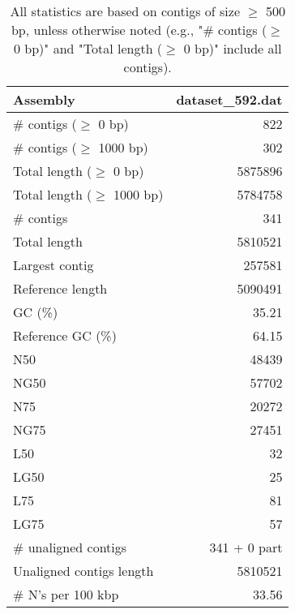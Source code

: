 \documentclass[12pt,a4paper]{article}
\begin{document}
\begin{table}[ht]
\begin{center}
\caption{All statistics are based on contigs of size $\geq$ 500 bp, unless otherwise noted (e.g., "\# contigs ($\geq$ 0 bp)" and "Total length ($\geq$ 0 bp)" include all contigs).}
\begin{tabular}{|l*{1}{|r}|}
\hline
Assembly & dataset\_592.dat \\ \hline
\# contigs ($\geq$ 0 bp) & 822 \\ \hline
\# contigs ($\geq$ 1000 bp) & 302 \\ \hline
Total length ($\geq$ 0 bp) & 5875896 \\ \hline
Total length ($\geq$ 1000 bp) & 5784758 \\ \hline
\# contigs & 341 \\ \hline
Total length & 5810521 \\ \hline
Largest contig & 257581 \\ \hline
Reference length & 5090491 \\ \hline
GC (\%) & 35.21 \\ \hline
Reference GC (\%) & 64.15 \\ \hline
N50 & 48439 \\ \hline
NG50 & 57702 \\ \hline
N75 & 20272 \\ \hline
NG75 & 27451 \\ \hline
L50 & 32 \\ \hline
LG50 & 25 \\ \hline
L75 & 81 \\ \hline
LG75 & 57 \\ \hline
\# unaligned contigs & 341 + 0 part \\ \hline
Unaligned contigs length & 5810521 \\ \hline
\# N's per 100 kbp & 33.56 \\ \hline
\end{tabular}
\end{center}
\end{table}
\end{document}
